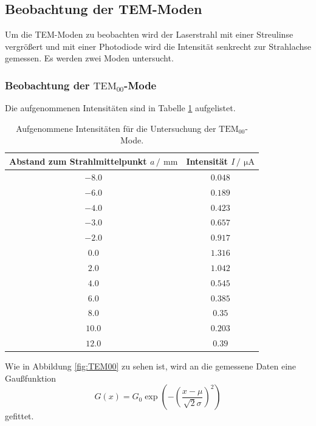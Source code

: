 \subsection{Beobachtung der TEM-Moden}
Um die TEM-Moden zu beobachten wird der Laserstrahl mit einer Streulinse vergrößert und mit einer Photodiode wird die 
Intensität senkrecht zur Strahlachse gemessen.
Es werden zwei Moden untersucht. 
\subsubsection{Beobachtung der \texorpdfstring{$\text{TEM}_{00}$}{T1}-Mode}
Die aufgenommenen Intensitäten sind in Tabelle \ref{tab:TEM00} aufgelistet.
\begin{table}
  \centering
  \caption{Aufgenommene Intensitäten für die Untersuchung der $\text{TEM}_{00}$-Mode.}
  \label{tab:TEM00}
  \begin{tabular}{c c}
    \toprule
    Abstand zum Strahlmittelpunkt $a\,/\,\SI{}{\milli\meter}$&Intensität $I \,/\,\SI{}{\micro\ampere}$\\
    \midrule
    $\num{-8.0}$&$\num{0.048}$\\
    $\num{-6.0}$&$\num{0.189}$\\
    $\num{-4.0}$&$\num{0.423}$\\
    $\num{-3.0}$&$\num{0.657}$\\
    $\num{-2.0}$&$\num{0.917}$\\
    $\num{0.0}$&$\num{1.316}$\\
    $\num{2.0}$&$\num{1.042}$\\
    $\num{4.0}$&$\num{0.545}$\\
    $\num{6.0}$&$\num{0.385}$\\
    $\num{8.0}$&$\num{0.35}$\\
    $\num{10.0}$&$\num{0.203}$\\
    $\num{12.0}$&$\num{0.39}$\\
    \bottomrule
  \end{tabular}
\end{table}
\FloatBarrier
Wie in Abbildung \ref{fig:TEM00} zu sehen ist, wird an die gemessene Daten eine Gaußfunktion
\begin{equation}
  \label{eq:Gaußfunktion}
  G(x)= G_{0}\exp{\left(-\left(\frac{x-\mu}{\sqrt{2}\sigma}\right)^2\right)}
\end{equation} 
gefittet. 
\FloatBarrier
